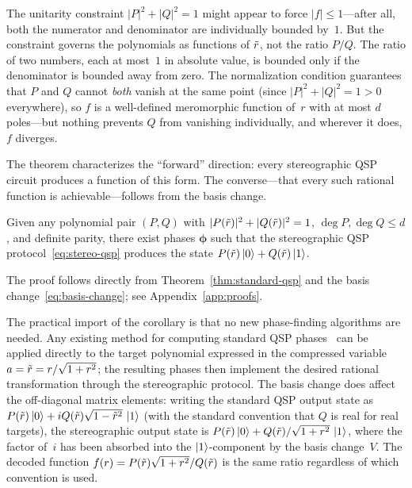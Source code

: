 The unitarity constraint $|P|^2 + |Q|^2 = 1$ might appear to
force $|f| \leq 1$---after all, both the numerator and
denominator are individually bounded by~$1$.  But the
constraint governs the polynomials as functions of $\tilde{r}$,
not the ratio $P/Q$.  The ratio of two numbers, each at most~$1$
in absolute value, is bounded only if the denominator is bounded
away from zero.  The normalization condition guarantees that $P$
and $Q$ cannot \emph{both} vanish at the same point (since
$|P|^2 + |Q|^2 = 1 > 0$ everywhere), so $f$ is a well-defined
meromorphic function of~$r$ with at most $d$ poles---but nothing
prevents $Q$ from vanishing individually, and wherever it does,
$f$ diverges.

The theorem characterizes the ``forward'' direction: every
stereographic QSP circuit produces a function of this form.
The converse---that every such rational function is
achievable---follows from the basis change.

\begin{corollary}
	\label{cor:existence}
	Given any polynomial pair $(P, Q)$ with
	$|P(\tilde{r})|^2 + |Q(\tilde{r})|^2 = 1$,
	$\deg P, \deg Q \leq d$, and definite parity, there exist
	phases $\bm{\phi}$ such that the stereographic QSP
	protocol~\eqref{eq:stereo-qsp} produces the state
	$P(\tilde{r})\ket{0} + Q(\tilde{r})\ket{1}$.
\end{corollary}

The proof follows directly from Theorem~\ref{thm:standard-qsp}
and the basis change~\eqref{eq:basis-change}; see
Appendix~\ref{app:proofs}.

The practical import of the corollary is that no new
phase-finding algorithms are needed.  Any existing method for
computing standard QSP
phases~\cite{DongMengWhaleyEtAl2021,Haah2019} can be applied
directly to the target polynomial expressed in the compressed
variable $a = \tilde{r} = r/\sqrt{1+r^2}$; the resulting
phases then implement the desired rational transformation
through the stereographic protocol.  The basis change does
affect the off-diagonal matrix elements: writing the standard
QSP output state as
$P(\tilde{r})\ket{0} + iQ(\tilde{r})\sqrt{1-\tilde{r}^2}\,\ket{1}$
(with the standard convention that $Q$ is real for real
targets), the stereographic output state is
$P(\tilde{r})\ket{0} + Q(\tilde{r})/\sqrt{1+r^2}\,\ket{1}$,
where the factor of~$i$ has been absorbed into the
$\ket{1}$-component by the basis change~$V$.  The decoded
function $f(r) = P(\tilde{r})\sqrt{1+r^2}/Q(\tilde{r})$ is the
same ratio regardless of which convention is used.



